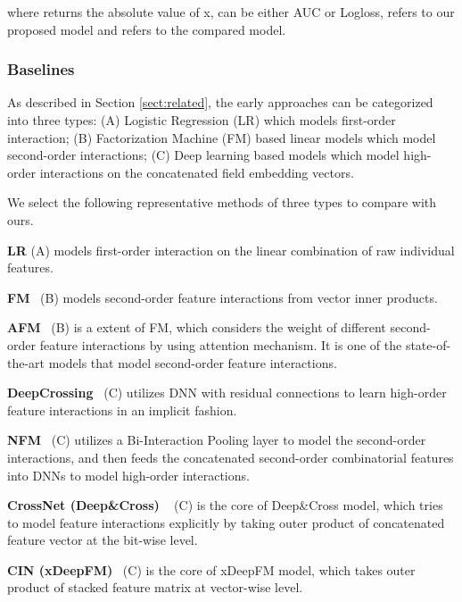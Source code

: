 \documentclass[sigconf]{acmart}
\begin{document}
where  returns the absolute value of x,  can be either AUC or Logloss,  refers to our proposed model and  refers to the compared model.




\subsubsection{Baselines} 
As described in Section \ref{sect:related}, 
the early approaches can be categorized into three types: 
(A) Logistic Regression (LR) which models first-order interaction;
(B) Factorization Machine (FM) based linear models which model second-order interactions; 
(C) Deep learning based models which model high-order interactions on the concatenated field embedding vectors. 

We select the following representative methods of three types to compare with ours.

\textbf{LR} (A) models first-order interaction on the linear combination of raw individual features.  

\textbf{FM}~\cite{rendle2010factorization} (B) models second-order feature interactions from vector inner products. 

\textbf{AFM}~\cite{xiao2017attentional} (B) is a extent of FM, which considers the weight of different second-order feature interactions by using attention mechanism.
It is one of the state-of-the-art models that model second-order feature interactions. 

\textbf{DeepCrossing}~\cite{shan2016deep} (C) utilizes DNN with residual connections to learn high-order feature interactions in an implicit fashion.


\textbf{NFM}~\cite{he2017neural} (C) utilizes a Bi-Interaction Pooling layer to model the second-order interactions, and then feeds the concatenated second-order combinatorial features into DNNs to model high-order interactions.

\textbf{CrossNet (Deep\&Cross) }~\cite{wang2017deep} (C) is the core of Deep\&Cross model, which tries to model feature interactions explicitly by taking outer product of concatenated feature vector at the bit-wise level.

\textbf{CIN (xDeepFM)}~\cite{lian2018xdeepfm} (C) is the core of xDeepFM model, which takes outer product of stacked feature matrix at vector-wise level.
\end{document}
